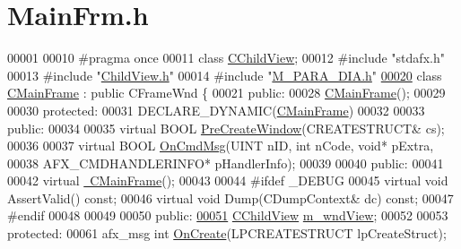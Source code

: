 \hypertarget{_main_frm_8h_source}{}\section{Main\+Frm.\+h}
\label{_main_frm_8h_source}

\begin{DoxyCode}
00001 
00010 \textcolor{preprocessor}{#pragma once}
00011 \textcolor{keyword}{class }\hyperlink{class_c_child_view}{CChildView};
00012 \textcolor{preprocessor}{#include "stdafx.h"}
00013 \textcolor{preprocessor}{#include "\hyperlink{_child_view_8h}{ChildView.h}"}
00014 \textcolor{preprocessor}{#include "\hyperlink{_m___p_a_r_a___d_i_a_8h}{M\_PARA\_DIA.h}"}
\hyperlink{class_c_main_frame}{00020} \textcolor{keyword}{class }\hyperlink{class_c_main_frame}{CMainFrame} : \textcolor{keyword}{public} CFrameWnd \{
00021  \textcolor{keyword}{public}:
00028   \hyperlink{class_c_main_frame_af3e997aeae4148d2aaa4a1e1ae7bdd53}{CMainFrame}();
00029 
00030  \textcolor{keyword}{protected}:
00031   DECLARE\_DYNAMIC(\hyperlink{class_c_main_frame}{CMainFrame})
00032 
00033  \textcolor{keyword}{public}:
00034   
00035   \textcolor{keyword}{virtual} BOOL \hyperlink{class_c_main_frame_a549bf677c955c2898c3c683321633c16}{PreCreateWindow}(CREATESTRUCT& cs);
00036  
00037   \textcolor{keyword}{virtual} BOOL \hyperlink{class_c_main_frame_ade959eb0bab719bf06bb9b18ee407101}{OnCmdMsg}(UINT nID, \textcolor{keywordtype}{int} nCode, \textcolor{keywordtype}{void}* pExtra,
00038                         AFX\_CMDHANDLERINFO* pHandlerInfo); 
00039 
00040  \textcolor{keyword}{public}:
00041   
00042   \textcolor{keyword}{virtual} \hyperlink{class_c_main_frame_a8ae555f23fdf97edb4feb4d3e1bfa4ee}{~CMainFrame}();
00043 
00044 \textcolor{preprocessor}{#ifdef \_DEBUG}
00045   \textcolor{keyword}{virtual} \textcolor{keywordtype}{void} AssertValid() \textcolor{keyword}{const};
00046   \textcolor{keyword}{virtual} \textcolor{keywordtype}{void} Dump(CDumpContext& dc) \textcolor{keyword}{const};
00047 \textcolor{preprocessor}{#endif}
00048 
00049   
00050 \textcolor{keyword}{public}:
\hyperlink{class_c_main_frame_a7c3af9327c496f8c807d578f7a4ef4c5}{00051}   \hyperlink{class_c_child_view}{CChildView} \hyperlink{class_c_main_frame_a7c3af9327c496f8c807d578f7a4ef4c5}{m\_wndView};
00052 
00053  \textcolor{keyword}{protected}:
00061   afx\_msg \textcolor{keywordtype}{int} \hyperlink{class_c_main_frame_a48666466fd37412fcaeff75c3b12e0ed}{OnCreate}(LPCREATESTRUCT lpCreateStruct);

\end{DoxyCode}
